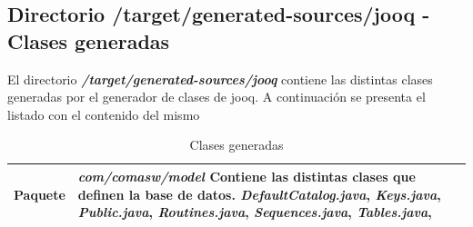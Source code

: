 \subsection{Directorio /target/generated-sources/jooq - Clases generadas}
\label{sub:clases-generadas}
El directorio \textit{\textbf{/target/generated-sources/jooq}} contiene las distintas clases generadas por el generador de clases de \acrshort{jooq}. A continuación se presenta el listado con el contenido del mismo



\begin{longtable}{m{1cm} m{11cm}}
    \caption{Clases generadas}
    \label{tab:generados}\\  	
    \rowcolors{2}{white}{white}
\textbf{Paquete} & \textit{\textbf{com/comasw/model}} \newline
	Contiene las distintas clases que definen la base de datos.\newline    
\textit{DefaultCatalog.java}, 
\textit{Keys.java}, 
\textit{Public.java}, 
\textit{Routines.java}, 
\textit{Sequences.java}, 
\textit{Tables.java},
\\\hline


\end{longtable}
